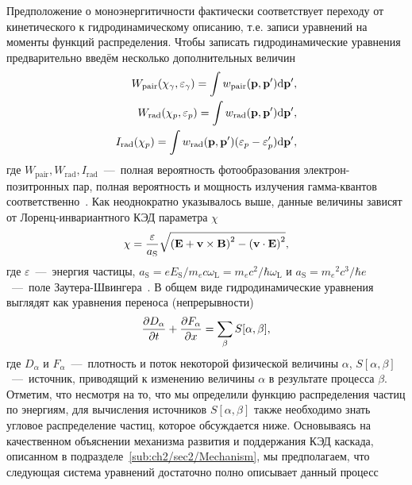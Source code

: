 Предположение о моноэнергитичности фактически соответствует переходу от кинетического к гидродинамическому описанию, т.е. записи уравнений на моменты функций распределения.
Чтобы записать гидродинамические уравнения предварительно введём несколько дополнительных величин
\begin{align}
    \label{eq:ch2/Wpair0}
    W_\mathrm{pair}(\chi_\gamma, \varepsilon_\gamma) = \int w_\mathrm{pair}(\vb{p},\vb{p'})\dd\vb{p'} ,\\
    \label{eq:ch2/Wrad0}
    W_\mathrm{rad}(\chi_p, \varepsilon_p) = \int w_\mathrm{rad}(\vb{p},\vb{p'})\dd\vb{p'} ,\\
    \label{eq:ch2/Irad0}
    I_\mathrm{rad}(\chi_p) = \int w_\mathrm{rad}(\vb{p},\vb{p'})(\varepsilon_p-\varepsilon_p')\dd\vb{p'},
\end{align}
где $W_\mathrm{pair}, W_\mathrm{rad}, I_\mathrm{rad}$~---~полная вероятность фотообразования электрон-позитронных пар, полная вероятность и мощность излучения гамма-квантов соответственно~\cite{Baier98}. 
Как неоднократно указывалось выше, данные величины зависят от Лоренц-инвариантного КЭД параметра $\chi$
\begin{equation}
    \chi = \frac{\varepsilon}{a_\mathrm{S}} \sqrt{ \left(\vb{E}+\vb{v}\times\vb{B}\right)^{2}-\left(\vb{v}\cdot\vb{E}\right)^{2} } ,
\end{equation}
где $\varepsilon$~---~энергия частицы, $a_\mathrm{S} = e E_\mathrm{S}/m_ec\omega_\mathrm{L} = m_ec^2/\hbar\omega_\mathrm{L}$ и $a_\mathrm{S}={m_e}^2c^3/\hbar e$~---~поле Заутера-Швингера~\cite{berestetskii1982quantum}.
В общем виде гидродинамические уравнения выглядят как уравнения переноса (непрерывности)
\begin{equation}
    \pdv{ D_\alpha}{ t} + \pdv{ F_\alpha}{ x} = \sum_{\beta} S[\alpha, \beta] ,
\end{equation}
где $D_\alpha$ и $F_\alpha$~---~плотность и поток некоторой физической величины $\alpha$, $S[\alpha,\beta]$~---~источник, приводящий к изменению величины $\alpha$ в результате процесса $\beta$.
Отметим, что несмотря на то, что мы определили функцию распределения частиц по энергиям, для вычисления источников $S[\alpha,\beta]$ также необходимо знать угловое распределение частиц, которое обсуждается ниже.
Основываясь на качественном объяснении механизма развития и поддержания КЭД каскада, описанном в подразделе~\ref{sub:ch2/sec2/Mechanism}, мы предполагаем, что следующая система уравнений достаточно полно описывает данный процесс 
